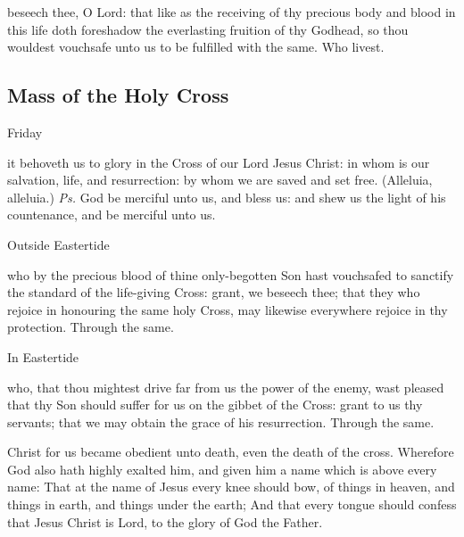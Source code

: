 \postcommunion
{} beseech thee, O Lord: that like as the receiving of thy precious body and blood in this life doth foreshadow the everlasting fruition of thy Godhead, so thou wouldest vouchsafe unto us to be fulfilled with the same. Who livest.


\subsection{Mass of the Holy Cross}
\begin{inhead}
	Friday
\end{inhead}

\introit
{} it behoveth us to glory in the Cross of our Lord Jesus Christ: in whom is our salvation, life, and resurrection: by whom we are saved and set free. (Alleluia, alleluia.) \textit{Ps.} God be merciful unto us, and bless us: and shew us the light of his countenance, and be merciful unto us.

\collect
\begin{inhead}
	Outside Eastertide
\end{inhead}
 who by the precious blood of thine only-begotten Son hast vouchsafed to sanctify the standard of the life-giving Cross: grant, we beseech thee; that they who rejoice in honouring the same holy Cross, may likewise everywhere rejoice in thy protection.  Through the same.

\begin{inhead}
	In Eastertide
\end{inhead}
 who, that thou mightest drive far from us the power of the enemy, wast pleased that thy Son should suffer for us on the gibbet of the Cross: grant to us thy servants; that we may obtain the grace of his resurrection.  Through the same.

 Christ for us became obedient unto death, even the death of the cross. Wherefore God also hath highly exalted him, and given him a name which is above every name: That at the name of Jesus every knee should bow, of things in heaven, and things in earth, and things under the earth; And that every tongue should confess that Jesus Christ is Lord, to the glory of God the Father.


